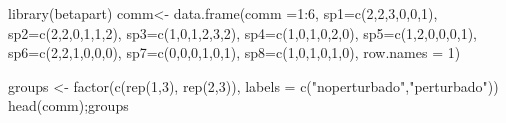 \documentclass[
]{article}
\newenvironment{Shaded}{\begin{snugshade}}{\end{snugshade}}
\newcommand{\AttributeTok}[1]{\textcolor[rgb]{0.77,0.63,0.00}{#1}}
\newcommand{\DecValTok}[1]{\textcolor[rgb]{0.00,0.00,0.81}{#1}}
\newcommand{\FunctionTok}[1]{\textcolor[rgb]{0.00,0.00,0.00}{#1}}
\newcommand{\NormalTok}[1]{#1}
\newcommand{\OtherTok}[1]{\textcolor[rgb]{0.56,0.35,0.01}{#1}}
\newcommand{\SpecialCharTok}[1]{\textcolor[rgb]{0.00,0.00,0.00}{#1}}
\newcommand{\StringTok}[1]{\textcolor[rgb]{0.31,0.60,0.02}{#1}}
\begin{document}
\begin{Shaded}
\begin{Highlighting}[]
\FunctionTok{library}\NormalTok{(betapart)}
\NormalTok{comm}\OtherTok{\textless{}{-}} \FunctionTok{data.frame}\NormalTok{(}\AttributeTok{comm =}\DecValTok{1}\SpecialCharTok{:}\DecValTok{6}\NormalTok{,}
                         \AttributeTok{sp1=}\FunctionTok{c}\NormalTok{(}\DecValTok{2}\NormalTok{,}\DecValTok{2}\NormalTok{,}\DecValTok{3}\NormalTok{,}\DecValTok{0}\NormalTok{,}\DecValTok{0}\NormalTok{,}\DecValTok{1}\NormalTok{),}
                         \AttributeTok{sp2=}\FunctionTok{c}\NormalTok{(}\DecValTok{2}\NormalTok{,}\DecValTok{2}\NormalTok{,}\DecValTok{0}\NormalTok{,}\DecValTok{1}\NormalTok{,}\DecValTok{1}\NormalTok{,}\DecValTok{2}\NormalTok{),}
                         \AttributeTok{sp3=}\FunctionTok{c}\NormalTok{(}\DecValTok{1}\NormalTok{,}\DecValTok{0}\NormalTok{,}\DecValTok{1}\NormalTok{,}\DecValTok{2}\NormalTok{,}\DecValTok{3}\NormalTok{,}\DecValTok{2}\NormalTok{),}
                         \AttributeTok{sp4=}\FunctionTok{c}\NormalTok{(}\DecValTok{1}\NormalTok{,}\DecValTok{0}\NormalTok{,}\DecValTok{1}\NormalTok{,}\DecValTok{0}\NormalTok{,}\DecValTok{2}\NormalTok{,}\DecValTok{0}\NormalTok{),}
                         \AttributeTok{sp5=}\FunctionTok{c}\NormalTok{(}\DecValTok{1}\NormalTok{,}\DecValTok{2}\NormalTok{,}\DecValTok{0}\NormalTok{,}\DecValTok{0}\NormalTok{,}\DecValTok{0}\NormalTok{,}\DecValTok{1}\NormalTok{),}
                         \AttributeTok{sp6=}\FunctionTok{c}\NormalTok{(}\DecValTok{2}\NormalTok{,}\DecValTok{2}\NormalTok{,}\DecValTok{1}\NormalTok{,}\DecValTok{0}\NormalTok{,}\DecValTok{0}\NormalTok{,}\DecValTok{0}\NormalTok{),}
                         \AttributeTok{sp7=}\FunctionTok{c}\NormalTok{(}\DecValTok{0}\NormalTok{,}\DecValTok{0}\NormalTok{,}\DecValTok{0}\NormalTok{,}\DecValTok{1}\NormalTok{,}\DecValTok{0}\NormalTok{,}\DecValTok{1}\NormalTok{),}
                         \AttributeTok{sp8=}\FunctionTok{c}\NormalTok{(}\DecValTok{1}\NormalTok{,}\DecValTok{0}\NormalTok{,}\DecValTok{1}\NormalTok{,}\DecValTok{0}\NormalTok{,}\DecValTok{1}\NormalTok{,}\DecValTok{0}\NormalTok{), }\AttributeTok{row.names =} \DecValTok{1}\NormalTok{)}


\NormalTok{groups }\OtherTok{\textless{}{-}} \FunctionTok{factor}\NormalTok{(}\FunctionTok{c}\NormalTok{(}\FunctionTok{rep}\NormalTok{(}\DecValTok{1}\NormalTok{,}\DecValTok{3}\NormalTok{), }\FunctionTok{rep}\NormalTok{(}\DecValTok{2}\NormalTok{,}\DecValTok{3}\NormalTok{)), }
                 \AttributeTok{labels =} \FunctionTok{c}\NormalTok{(}\StringTok{"noperturbado"}\NormalTok{,}\StringTok{"perturbado"}\NormalTok{))}
\FunctionTok{head}\NormalTok{(comm);groups}
\end{Highlighting}
\end{Shaded}
\end{document}
